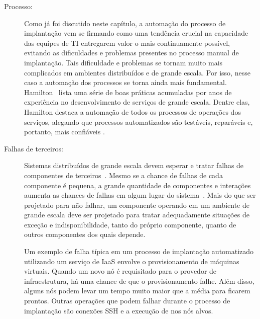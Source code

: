 \begin{description}

\item [Processo:]

Como já foi discutido neste capítulo, a automação do processo de implantação
vem se firmando como uma tendência crucial na capacidade
das equipes de TI entregarem valor o mais continuamente possível,
evitando as dificuldades e problemas presentes no processo manual de implantação.
Tais dificuldade e problemas se tornam muito mais complicados em ambientes distribuídos
e de grande escala. Por isso, nesse caso a automação dos processos se torna
ainda mais fundamental.
Hamilton~\cite{Hamilton2007InternetScale} lista uma série de boas práticas acumuladas 
por anos de experiência no desenvolvimento de serviços de grande escala.
Dentre elas, Hamilton destaca a automação de todos os processos de operações dos serviços,
alegando que processos automatizados são testáveis, reparáveis e, portanto,
mais confiáveis .

\item [Falhas de terceiros:] 

Sistemas distribuídos de grande escala devem esperar e tratar falhas
de componentes de terceiros~\cite{Hamilton2007InternetScale,Helland2009Quicksand,CarnegieMellon2006ULS}.
Mesmo se a chance de falhas de cada componente é pequena,
a grande quantidade de componentes e interações aumenta as chances de 
falhas em algum lugar do sistema~\cite{CarnegieMellon2006ULS}.
Mais do que ser projetado para não falhar, um componente operando em um ambiente  de grande escala deve ser projetado para tratar adequadamente situações de exceção e indisponibilidade, tanto do próprio componente, quanto de outros componentes dos quais depende.

Um exemplo de falha típica em um processo de implantação automatizado
utilizando um serviço de IaaS envolve o provisionamento de máquinas virtuais.
Quando um novo nó é requisitado para o provedor de infraestrutura,
há uma chance de que o provisionamento falhe.
Além disso, alguns nós podem levar um tempo muito maior que a média para ficarem prontos.
Outras operações que podem falhar durante o processo de implantação são
conexões SSH e a execução de \scripts nos nós alvos.


\end{description}
